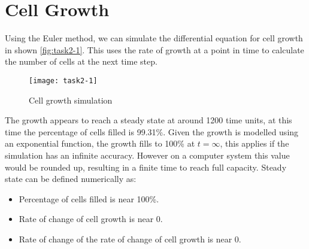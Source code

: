 \section{Cell Growth}











Using the Euler method, we can simulate the differential equation for cell growth in shown \autoref{fig:task2-1}.
This uses the rate of growth at a point in time to calculate the number of cells at the next time step.

\begin{figure}[ht]
    \centering
    \texttt{[image: task2-1]}
    \caption[Cell growth simulation]{Cell growth simulation}
    \label{fig:task2-1}
\end{figure}

The growth appears to reach a steady state at around 1200 time units, at this time the percentage of cells filled is 99.31\%.
Given the growth is modelled using an exponential function, the growth fills to 100\% at $t = \infty$,
this applies if the simulation has an infinite accuracy.
However on a computer system this value would be rounded up, resulting in a finite time to reach full capacity.
Steady state can be defined numerically as:

\begin{itemize}
    \item Percentage of cells filled is near 100\%.
    \item Rate of change of cell growth is near 0.
    \item Rate of change of the rate of change of cell growth is near 0.
\end{itemize}

